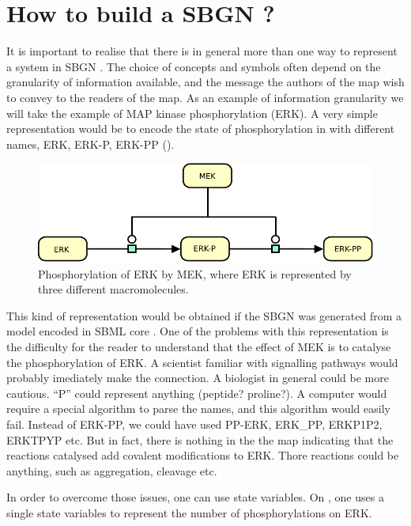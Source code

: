 \chapter{How to build a SBGN \PDm?}

It is important to realise that there is in general more than one way to represent a system in SBGN \PD. The choice of concepts and symbols often depend on the granularity of information available, and the message the authors of the map wish to convey to the readers of the map. As an example of information granularity we will take the example of MAP kinase 
phosphorylation (ERK). A very simple representation would be to encode the state of phosphorylation in  with different names, ERK, ERK-P, ERK-PP ().
 
\begin{figure}[H]
  \centering
  \includegraphics[scale = 1]{images/MAPK-NoVar}
  \caption{Phosphorylation of ERK by MEK, where ERK is represented by three different macromolecules.}
  \label{fig:MAPK-NoVar}
\end{figure}

This kind of representation would be obtained if the SBGN \PDm was generated from a model encoded in SBML core \cite{Hucka:2003}. One of the problems with this representation is the difficulty for the reader to understand that the effect of MEK is to catalyse the phosphorylation of ERK. A scientist familiar with signalling pathways would probably imediately make the connection. A biologist in general could be more cautious. ``P'' could represent anything (peptide? proline?). A computer would require a special algorithm to parse the names, and this algorithm would easily fail. Instead of ERK-PP, we could have used PP-ERK, ERK\_PP, ERKP1P2, ERKTPYP etc. But in fact, there is nothing in the the map  indicating that the reactions catalysed add covalent modifications to ERK. Thore reactions could be anything, such as aggregation, cleavage etc.

In order to overcome those issues, one can use state variables. On , one uses a single state variables to represent the number of phosphorylations on ERK. 


